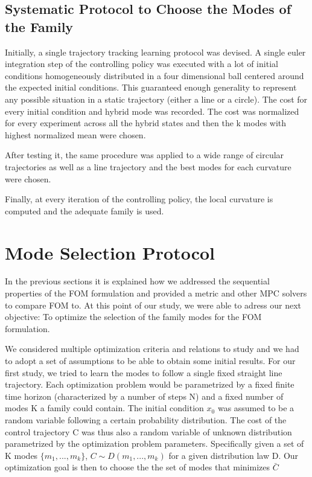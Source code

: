 \documentclass[12,twoside]{TFG-GM}
\theoremstyle{definition}
\theoremstyle{remark}
\newcommand*\mean[1]{\bar{#1}}
\begin{document}
\subsection{Systematic Protocol to Choose the Modes of the Family}
Initially, a single trajectory tracking learning protocol was devised. A single euler integration step of the controlling policy was executed with a lot of initial conditions homogeneously distributed in a four dimensional ball centered around the expected initial conditions. This guaranteed enough generality to represent any possible situation in a static trajectory (either a line or a circle). The cost for every initial condition and hybrid mode was recorded. The cost was normalized for every experiment across all the hybrid states and then the k modes with highest normalized mean were chosen.

After testing it, the same procedure was applied to a wide range of circular trajectories as well as a line trajectory and the best modes for each curvature were chosen.

Finally, at every iteration of the controlling policy, the local curvature is computed and the adequate family is used.

\section{Mode Selection Protocol}
\label{sec:modeselection}
In the previous sections it is explained how we addressed the sequential properties of the FOM formulation and provided a metric and other MPC solvers to compare FOM to. At this point of our study, we were able to adress our next objective: To optimize the selection of the family modes for the FOM formulation.

We considered multiple optimization criteria and relations to study and we had to adopt a set of assumptions to be able to obtain some initial results. For our first study, we tried to learn the modes to follow a single fixed straight line trajectory. Each optimization problem would be parametrized by a fixed finite time horizon (characterized by a number of steps N) and a fixed number of modes K a family could contain. The initial condition $x_0$ was assumed to be a random variable following a certain probability distribution. The cost of the control trajectory C was thus also a random variable of unknown distribution parametrized by the optimization problem parameters. Specifically given a set of K modes $\{m_1, ..., m_k\}$, $C \sim D(m_1, ..., m_k)$ for a given distribution law D. Our optimization goal is then to choose the the set of modes that minimizes $\mean{C}$
\end{document}
